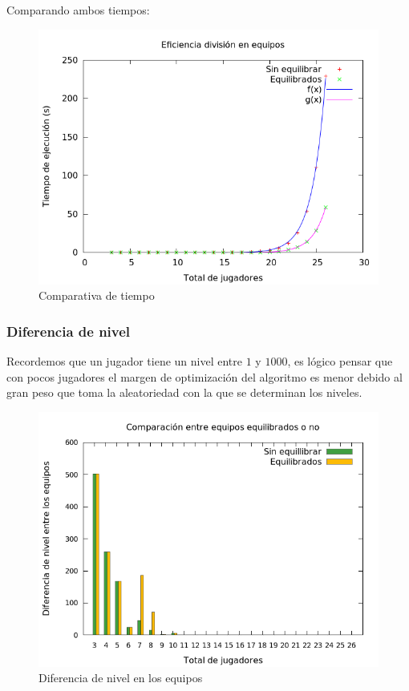 Comparando ambos tiempos:

\begin{figure}[H]
    \centering
    \includegraphics[scale=0.5]{../Equipos/Graficas/tiempos.png}
    \caption{Comparativa de tiempo}
    \label{fig:divisionTiempos}
\end{figure}

\subsubsection{Diferencia de nivel}
Recordemos que un jugador tiene un nivel entre $1$ y $1000$, es lógico pensar que con pocos jugadores el margen de optimización del algoritmo es menor debido al gran peso que toma la aleatoriedad con la que se determinan los niveles.
\begin{figure}[H]
    \centering
    \includegraphics[scale=0.5]{../Equipos/Graficas/comparativa.png}
    \caption{Diferencia de nivel en los equipos}
    \label{fig:Sin equilibrar}
\end{figure}

